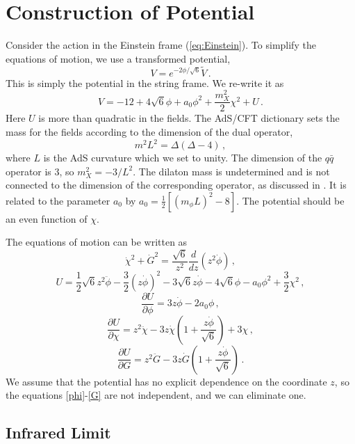 \documentclass[aps,prd,12pt,nofootinbib]{revtex4}
\newcommand{\be}{\begin{equation}}
\newcommand{\ee}{\end{equation}}
\def\thalf{{\textstyle{\frac{1}{2}}}}
\def\tthalf{{\textstyle{\frac{3}{2}}}}
\def\Dz{\frac{d}{dz}}
\def\phidot{\dot{\phi}}
\def\phiddot{\ddot{\phi}}
\def\chidot{\dot{\chi}}
\def\chiddot{\ddot{\chi}}
\def\Gdot{\dot{G}}
\def\Gddot{\ddot{G}}
\def\rt6{\sqrt{6}}
\def\mL2{(m_{\phi}L)^2}
\begin{document}
\section{Construction of Potential}

Consider the action in the Einstein frame (\ref{eq:Einstein}).
To simplify the equations of motion, we use a transformed potential, 
\be
V=e^{-2\phi/\rt6}\tilde{V} \, .
\label{transform}
\ee
This is simply the potential in the string frame.
We re-write it as
\be
V = -12 + 4\sqrt{6}\phi + a_0\phi^2 +\frac{m_X^2}{2}\chi^2 + U \,.
\label{V}
\ee
Here $U$ is more than quadratic in the fields. 
 The AdS/CFT dictionary sets the mass for the fields according to the dimension of the dual operator,
\be
m^2L^2=\Delta(\Delta-4) \,,
\ee
where $L$ is the AdS curvature which we set to unity.  The dimension of the $q\bar{q}$ operator is 3, so $m_X^2 = -3/L^2$.
The dilaton mass is undetermined and is not connected to the dimension of the corresponding operator, as discussed in \cite{Springer2010}.  
It is related to the parameter $a_0$ by $a_0 = \thalf \left[ \mL2-8 \right]$. 
The potential should be an even function of $\chi$. 

The equations of motion can be written as
\be
\chidot^2 + \Gdot^2 = \frac{\rt6}{z^2} \Dz(z^2\phidot) \, ,
\label{C}
\ee
\be
U=\thalf \rt6 z^2 \phiddot - \tthalf (z\phidot)^2 - 3 \rt6 z\phidot 
-4\sqrt{6}\phi - a_0\phi^2 +\tthalf\chi^2 \, ,
\label{U}
\ee
\be
 \frac{\partial U}{\partial \phi}=3z\phidot - 2a_0\phi \, ,
\label{phi}
\ee
\be
 \frac{\partial U}{\partial \chi}
=z^2\chiddot -3z\chidot \left(1+\frac{z\phidot}{\rt6} \right) + 3\chi \, ,
\label{chi}
\ee
\be
 \frac{\partial U}{\partial G}=
z^2\Gddot -3z\Gdot \left(1+\frac{z\phidot}{\rt6} \right) \, .
\label{G}
\ee
We assume that the potential has no explicit dependence on the coordinate $z$,  so the equations \ref{phi}-\ref{G} are not independent, and we can eliminate one. 

\subsection{Infrared Limit}
\end{document}
